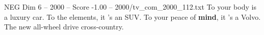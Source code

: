 \begin{textsample}{NEG Dim 6 – 2000 – Score -1.00 – 2000/tv\_com\_2000\_112.txt}  \label{ex:f6_neg_015}
To your body is a luxury car.
To the elements, it 's an SUV.
To your peace of \textbf{mind}, it 's a Volvo.
The new all-wheel drive cross-country.

\end{textsample}
